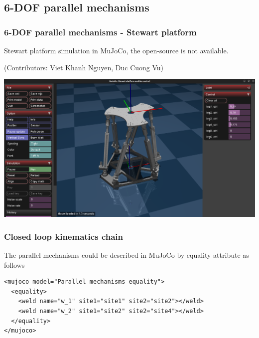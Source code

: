 \documentclass[9pt]{beamer}
\begin{document}
		\subsection{6-DOF parallel mechanisms}
			\begin{frame}
				\frametitle{6-DOF parallel mechanisms - Stewart platform}
				Stewart platform simulation in MuJoCo, the open-source is not available.
				
				(Contributors: Viet Khanh Nguyen, Duc Cuong Vu)
				
				\begin{center}
					\includegraphics[width=0.9\linewidth]{mujoco-stewart}
				\end{center}
				
			\end{frame}
		
		
		
			\begin{frame}[fragile]
				\frametitle{Closed loop kinematics chain}
				\begin{figure}
					\scalebox{0.7}{}
				\end{figure}
			
				The parallel mechanisms could be described in MuJoCo by equality attribute as follows
				\begin{verbatim}
<mujoco model="Parallel mechanisms equality">
  <equality>
    <weld name="w_1" site1="site1" site2="site2"></weld>
    <weld name="w_2" site1="site2" site2="site4"></weld>
  </equality>
</mujoco>
				\end{verbatim}
			\end{frame}
		
		
			
\end{document}
